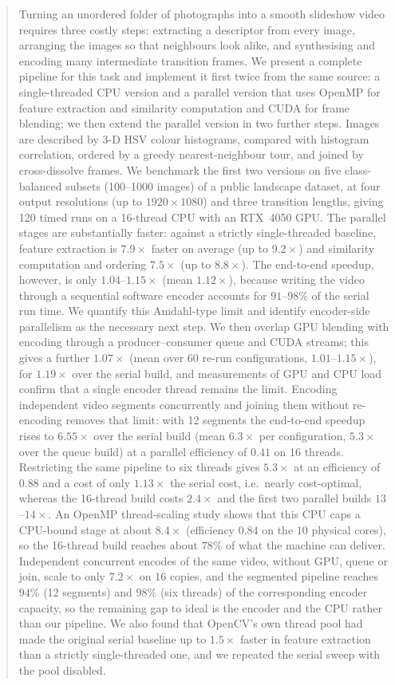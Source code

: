 \documentclass[conference]{IEEEtran}
\begin{document}
\begin{abstract}
Turning an unordered folder of photographs into a smooth slideshow video requires three costly steps: extracting a descriptor from every image, arranging the images so that neighbours look alike, and synthesising and encoding many intermediate transition frames. We present a complete pipeline for this task and implement it first twice from the same source: a single-threaded CPU version and a parallel version that uses OpenMP for feature extraction and similarity computation and CUDA for frame blending; we then extend the parallel version in two further steps. Images are described by 3-D HSV colour histograms, compared with histogram correlation, ordered by a greedy nearest-neighbour tour, and joined by cross-dissolve frames. We benchmark the first two versions on five class-balanced subsets (100--1000 images) of a public landscape dataset, at four output resolutions (up to $1920\times1080$) and three transition lengths, giving 120 timed runs on a 16-thread CPU with an RTX~4050 GPU. The parallel stages are substantially faster: against a strictly single-threaded baseline, feature extraction is $7.9\times$ faster on average (up to $9.2\times$) and similarity computation and ordering $7.5\times$ (up to $8.8\times$). The end-to-end speedup, however, is only $1.04$--$1.15\times$ (mean $1.12\times$), because writing the video through a sequential software encoder accounts for $91$--$98\%$ of the serial run time. We quantify this Amdahl-type limit and identify encoder-side parallelism as the necessary next step. We then overlap GPU blending with encoding through a producer--consumer queue and CUDA streams; this gives a further $1.07\times$ (mean over 60 re-run configurations, $1.01$--$1.15\times$), for $1.19\times$ over the serial build, and measurements of GPU and CPU load confirm that a single encoder thread remains the limit. Encoding independent video segments concurrently and joining them without re-encoding removes that limit: with 12 segments the end-to-end speedup rises to $6.55\times$ over the serial build (mean $6.3\times$ per configuration, $5.3\times$ over the queue build) at a parallel efficiency of $0.41$ on 16 threads. Restricting the same pipeline to six threads gives $5.3\times$ at an efficiency of $0.88$ and a cost of only $1.13\times$ the serial cost, i.e.\ nearly cost-optimal, whereas the 16-thread build costs $2.4\times$ and the first two parallel builds $13$--$14\times$. An OpenMP thread-scaling study shows that this CPU caps a CPU-bound stage at about $8.4\times$ (efficiency $0.84$ on the $10$ physical cores), so the 16-thread build reaches about $78\%$ of what the machine can deliver. Independent concurrent encodes of the same video, without GPU, queue or join, scale to only $7.2\times$ on 16 copies, and the segmented pipeline reaches $94\%$ (12 segments) and $98\%$ (six threads) of the corresponding encoder capacity, so the remaining gap to ideal is the encoder and the CPU rather than our pipeline. We also found that OpenCV's own thread pool had made the original serial baseline up to $1.5\times$ faster in feature extraction than a strictly single-threaded one, and we repeated the serial sweep with the pool disabled.
\end{abstract}
\end{document}
